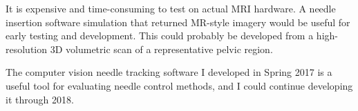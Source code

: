 It is expensive and time-consuming to test on actual MRI hardware. A needle insertion software simulation that returned MR-style imagery would be useful for early testing and development. This could probably be developed from a high-resolution 3D volumetric scan of a representative pelvic region.

The computer vision needle tracking software I developed in Spring 2017 is a useful tool for evaluating needle control methods, and I could continue developing it through 2018.

















